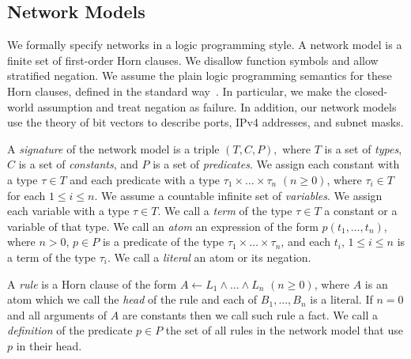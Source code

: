 
\subsection{Network Models}
\label{sect:aws/reachability/spec}
We formally specify networks in a logic programming style. A network model is a finite set of first-order Horn clauses. We disallow function symbols and allow stratified negation. We assume the plain logic programming semantics for these Horn clauses, defined in the standard way~\cite{}. In particular, we make the closed-world assumption and treat negation as failure. In addition, our network models use the theory of bit vectors to describe ports, IPv4 addresses, and subnet masks.

A \emph{signature} of the network model is a triple $(T, C, P),$ where $T$ is a set of \emph{types}, $C$ is a set of \emph{constants}, and $P$ is a set of \emph{predicates}. We assign each constant with a type $\tau\in T$ and each predicate with a type $\tau_1\times\ldots\times\tau_n$ $(n\ge0)$, where $\tau_i\in T$ for each $1\leq i \leq n$. We assume a countable infinite set of \emph{variables}. We assign each variable with a type $\tau\in T$. We call a \emph{term} of the type $\tau\in T$ a constant or a variable of that type. We call an \emph{atom} an expression of the form $p(t_1,\ldots,t_n)$, where $n>0$, $p\in P$ is a predicate of the type $\tau_1\times\ldots\times\tau_n$, and each $t_i$, $1\leq i \leq n$ is a term of the type $\tau_i$. We call a \emph{literal} an atom or its negation.

A \emph{rule} is a Horn clause of the form $A\leftarrow L_1 \wedge \ldots \wedge L_n$ $(n \ge 0)$, where $A$ is an atom which we call the \emph{head} of the rule and each of $B_1,\ldots,B_n$ is a literal. If $n=0$ and all arguments of $A$ are constants then we call such rule a fact. We call a \emph{definition} of the predicate $p \in P$ the set of all rules in the network model that use $p$ in their head.

